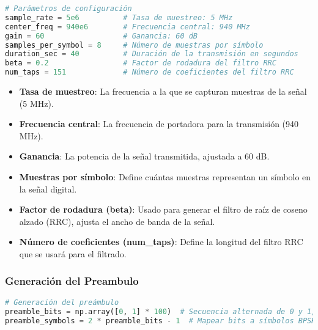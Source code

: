 \documentclass[letterpaper,12pt,oneside]{article}
\begin{document}
\begin{tcolorbox}[title=\textbf{Parámetros de Configuración}, colframe=black, colback=white]
\begin{lstlisting}[language=Python]
# Parámetros de configuración
sample_rate = 5e6          # Tasa de muestreo: 5 MHz
center_freq = 940e6        # Frecuencia central: 940 MHz
gain = 60                  # Ganancia: 60 dB
samples_per_symbol = 8     # Número de muestras por símbolo
duration_sec = 40          # Duración de la transmisión en segundos
beta = 0.2                 # Factor de rodadura del filtro RRC
num_taps = 151             # Número de coeficientes del filtro RRC
\end{lstlisting}
\end{tcolorbox}

\begin{itemize}
    \item \textbf{Tasa de muestreo}: La frecuencia a la que se capturan muestras de la señal (5 MHz).
    \item \textbf{Frecuencia central}: La frecuencia de portadora para la transmisión (940 MHz).
    \item \textbf{Ganancia}: La potencia de la señal transmitida, ajustada a 60 dB.
    \item \textbf{Muestras por símbolo}: Define cuántas muestras representan un símbolo en la señal digital.
    \item \textbf{Factor de rodadura (beta)}: Usado para generar el filtro de raíz de coseno alzado (RRC), ajusta el ancho de banda de la señal.
    \item \textbf{Número de coeficientes (num\_taps)}: Define la longitud del filtro RRC que se usará para el filtrado.
\end{itemize}

\subsubsection*{Generación del Preambulo}

\begin{tcolorbox}[title=\textbf{Generación del Preambulo}, colframe=black, colback=white]
\begin{lstlisting}[language=Python]
# Generación del preámbulo
preamble_bits = np.array([0, 1] * 100)  # Secuencia alternada de 0 y 1, longitud 200 bits
preamble_symbols = 2 * preamble_bits - 1  # Mapear bits a símbolos BPSK (-1, +1)
\end{lstlisting}
\end{tcolorbox}
\end{document}
